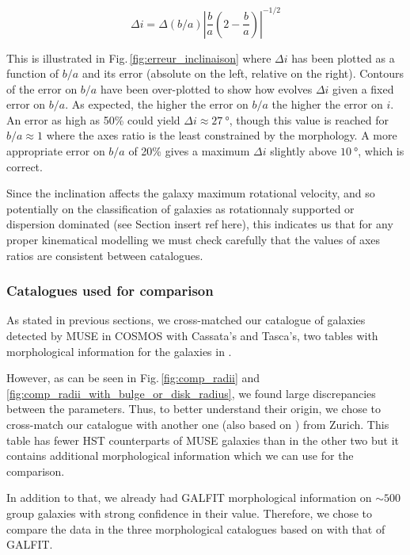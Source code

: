 \begin{equation}
	\Delta i = \Delta (b/a) \left | \frac{b}{a} \left ( 2 - \frac{b}{a} \right ) \right | ^{-1/2}
\end{equation}

This is illustrated in Fig.\,\ref{fig:erreur_inclinaison} where $\Delta i$ has been plotted as a function of $b/a$ and its error (absolute on the left, relative on the right). Contours of the error on $b/a$ have been over-plotted to show how evolves $\Delta i$ given a fixed error on $b/a$. As expected, the higher the error on $b/a$ the higher the error on $i$. An error as high as 50\% could yield $\Delta i \approx \SI{27}{\degree}$, though this value is reached for $b/a \approx 1$ where the axes ratio is the least constrained by the morphology. A more appropriate error on $b/a$ of 20\% gives a maximum $\Delta i$ slightly above $\SI{10}{\degree}$, which is correct. 

Since the inclination affects the galaxy maximum rotational velocity, and so potentially on the classification of galaxies as rotationnaly supported or dispersion dominated (see Section insert ref here), this indicates us that for any proper kinematical modelling we must check carefully that the values of axes ratios are consistent between catalogues.

\subsubsection{Catalogues used for comparison}

As stated in previous sections, we cross-matched our catalogue of galaxies detected by MUSE in COSMOS with Cassata's and Tasca's, two tables with morphological information for the galaxies in . 

However, as can be seen in Fig.\,\ref{fig:comp_radii} and \ref{fig:comp_radii_with_bulge_or_disk_radius}, we found large discrepancies between the parameters. Thus, to better understand their origin, we chose to cross-match our catalogue with another one (also based on ) from Zurich. This table has fewer HST counterparts of MUSE galaxies than in the other two but it contains additional morphological information which we can use for the comparison. 

In addition to that, we already had GALFIT morphological information on $\sim 500$ group galaxies with strong confidence in their value. Therefore, we chose to compare the data in the three morphological catalogues based on  with that of GALFIT.

